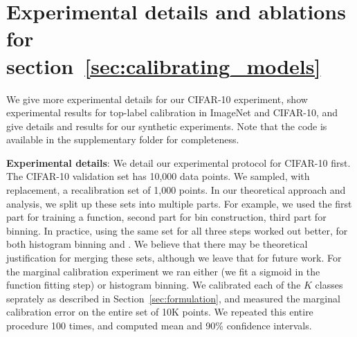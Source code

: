 
\section{Experimental details and ablations for section~\ref{sec:calibrating_models}}

\label{sec:calibrating_models_appendix_experiments}

We give more experimental details for our CIFAR-10 experiment, show experimental results for top-label calibration in ImageNet and CIFAR-10, and give details and results for our synthetic experiments. Note that the code is available in the supplementary folder for completeness.

\textbf{Experimental details}: We detail our experimental protocol for CIFAR-10 first. The CIFAR-10 validation set has 10,000 data points. We sampled, with replacement, a recalibration set of 1,000 points. In our theoretical approach and analysis, we split up these sets into multiple parts. For example, we used the first part for training a function, second part for bin construction, third part for binning. In practice, using the same set for all three steps worked out better, for both histogram binning and \ourcal{}. We believe that there may be theoretical justification for merging these sets, although we leave that for future work. For the marginal calibration experiment we ran either \ourcal{} (we fit a sigmoid in the function fitting step) or histogram binning. We calibrated each of the $K$ classes seprately as described in Section~\ref{sec:formulation}, and measured the marginal calibration error on the entire set of 10K points. We repeated this entire procedure 100 times, and computed mean and 90\% confidence intervals.

